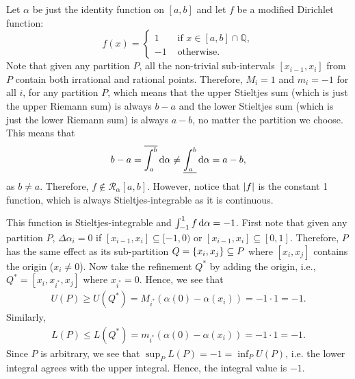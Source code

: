 \documentclass[12pt]{article}
\begin{document}
\begin{fproof}[3]
  Let \(\alpha\) be just the identity function on \([a,b]\) and let \(f\) be a modified Dirichlet function:
\[
f(x) = \begin{cases}
  1 &\text{ if } x \in [a,b] \cap \mathbb{Q},\\
  -1 &\text{ otherwise.}
\end{cases}
\]
Note that given any partition \(P\), all the non-trivial sub-intervals \([x_{i-1}, x_i]\) from \(P\) contain both irrational and rational points.
Therefore, \(M_i = 1\) and \(m_i = -1\) for all \(i\), for any partition \(P\), which means that the upper Stieltjes sum (which is just the upper Riemann sum) is always \(b-a\) and the lower Stieltjes sum (which is just the lower Riemann sum) is always \(a-b\), no matter the partition we choose.
This means that
\begin{align*}
  b-a = \overline{\int_{a}^{b}} \mathop{}\!\mathrm{d}\alpha \neq \underline{\int_{a}^{b}} \mathop{}\!\mathrm{d}\alpha = a-b,
\end{align*}
as \(b \neq a\).
Therefore, \(f \notin \mathcal{R}_{\alpha}[a,b]\).
However, notice that \(\left\lvert f \right\rvert\) is the constant 1 function, which is always Stieltjes-integrable as it is continuous.
\end{fproof}
\newpage

\begin{fproof}[4(a)]
  This function is Stieltjes-integrable and \(\int_{-1}^{1} f \mathop{}\!\mathrm{d}\alpha = -1\).
  First note that given any partition \(P\), \(\Delta \alpha_i = 0\) if \([x_{i-1}, x_i] \subseteq [-1,0)\) or \([x_{i-1}, x_i] \subseteq [0,1]\).
  Therefore, \(P\) has the same effect as its sub-partition \(Q = \left\{ x_i,x_j \right\}\subseteq P\) where \([x_i,x_j]\) contains the origin (\(x_i \neq 0\)).
  Now take the refinement \(Q^*\) by adding the origin, i.e., \(Q^* = [x_i, x_{i^*}, x_j]\) where \(x_{i^*} = 0\).
  Hence, we see that 
  \begin{align*}
    U(P) \geq U(Q^*) = M_{i^*} (\alpha(0) - \alpha(x_i)) = -1 \cdot 1  = -1.
  \end{align*}
  Similarly,
  \begin{align*}
    L(P) \leq L(Q^*) = m_{i^*} (\alpha(0) - \alpha(x_i)) = -1 \cdot 1 = -1.
  \end{align*}
  Since \(P\) is arbitrary,
  we see that \(\sup_P L(P) = -1 = \inf_P U(P)\), i.e. the lower integral agrees with the upper integral.
  Hence, the integral value is \(-1\).

\end{fproof}
\end{document}
